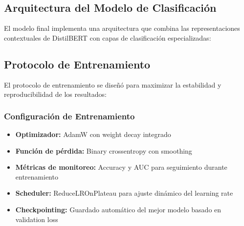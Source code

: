 \subsection{Arquitectura del Modelo de Clasificación}

El modelo final implementa una arquitectura que combina las representaciones contextuales de DistilBERT con capas de clasificación especializadas:

\begin{table}[htbp]
\centering
{}
\caption{Arquitectura del modelo de clasificación basado en DistilBERT.}
\label{tab:arquitectura_modelo}
\end{table}

\subsection{Protocolo de Entrenamiento}

El protocolo de entrenamiento se diseñó para maximizar la estabilidad y reproducibilidad de los resultados:

\subsubsection{Configuración de Entrenamiento}

\begin{itemize}
    \item \textbf{Optimizador:} AdamW con weight decay integrado
    \item \textbf{Función de pérdida:} Binary crossentropy con smoothing
    \item \textbf{Métricas de monitoreo:} Accuracy y AUC para seguimiento durante entrenamiento
    \item \textbf{Scheduler:} ReduceLROnPlateau para ajuste dinámico del learning rate
    \item \textbf{Checkpointing:} Guardado automático del mejor modelo basado en validation loss
\end{itemize}


